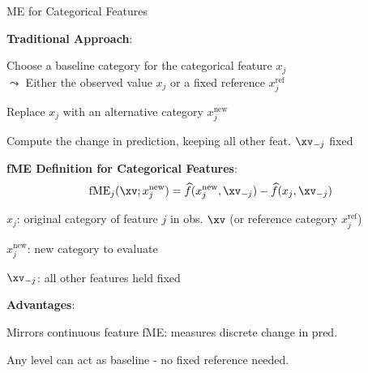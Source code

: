 \documentclass[10pt,compress,t,notes=noshow, xcolor=table]{beamer}
\begin{document}
\begin{framei}[align=top]{ME for Categorical Features}
\item \textbf{Traditional Approach}:
\begin{itemizeS}
\item Choose a baseline category for the categorical feature $x_j$ \\
$\leadsto$ Either the observed value $x_j$ or a fixed reference $x_j^\text{ref}$
\item Replace $x_j$ with an alternative category $x_j^\text{new}$
\item Compute the change in prediction, keeping all other feat. $\xv_{-j}$ fixed
\end{itemizeS}
\item \textbf{fME Definition for Categorical Features}:\\
\spacer[0.25]
$$
\text{fME}_j(\xv; x_j^\text{new}) = \widehat{f}(x_j^\text{new}, \xv_{-j}) - \widehat{f}(x_j, \xv_{-j})
$$
\begin{itemizeS}
\item $x_j$: original category of feature $j$ in obs. $\xv$ (or reference category $x_j^\text{ref}$)
\item $x_j^\text{new}$: new category to evaluate
\item $\xv_{-j}$: all other features held fixed
\end{itemizeS}
\item \textbf{Advantages}:
\begin{itemizeS}
\item Mirrors continuous feature fME: measures discrete change in pred.
\item Any level can act as baseline - no fixed reference needed.
\end{itemizeS}
\end{framei}
\end{document}
